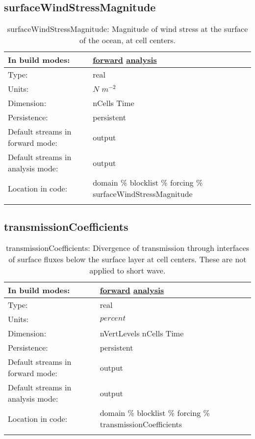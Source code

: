 \subsection[surfaceWindStressMagnitude]{surfaceWindStressMagnitude}
\label{subsec:var_sec_forcing_surfaceWindStressMagnitude}
\begin{center}
\begin{longtable}{| p{2.0in} | p{4.0in} |}
        \hline 
        In build modes: & \hyperref[subsec:forward_var_tab_forcing]{forward} \hyperref[subsec:analysis_var_tab_forcing]{analysis} \\
        \hline 
        Type: & real \\
        \hline 
        Units: & $N$ $m^{-2}$ \\
        \hline 
        Dimension: & nCells Time \\
        \hline 
        Persistence: & persistent \\
        \hline 
		 Default streams in forward mode: &  output \\
        \hline 
		 Default streams in analysis mode: &  output \\
        \hline 
		 Location in code: & domain \% blocklist \% forcing \% surfaceWindStressMagnitude \\
		 \hline 
    \caption{surfaceWindStressMagnitude: Magnitude of wind stress at the surface of the ocean, at cell centers.}
\end{longtable}
\end{center}
\subsection[transmissionCoefficients]{transmissionCoefficients}
\label{subsec:var_sec_forcing_transmissionCoefficients}
\begin{center}
\begin{longtable}{| p{2.0in} | p{4.0in} |}
        \hline 
        In build modes: & \hyperref[subsec:forward_var_tab_forcing]{forward} \hyperref[subsec:analysis_var_tab_forcing]{analysis} \\
        \hline 
        Type: & real \\
        \hline 
        Units: & $percent$ \\
        \hline 
        Dimension: & nVertLevels nCells Time \\
        \hline 
        Persistence: & persistent \\
        \hline 
		 Default streams in forward mode: &  output \\
        \hline 
		 Default streams in analysis mode: &  output \\
        \hline 
		 Location in code: & domain \% blocklist \% forcing \% transmissionCoefficients \\
		 \hline 
    \caption{transmissionCoefficients: Divergence of transmission through interfaces of surface fluxes below the surface layer at cell centers. These are not applied to short wave.}
\end{longtable}
\end{center}
